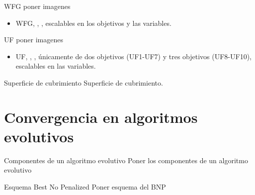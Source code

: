\documentclass{beamer}
\begin{document}
\begin{frame}{WFG}
poner imagenes
\begin{itemize}
   \item WFG, \citeauthor{Joel:WFG_Main}, \citeyear{Joel:WFG_Main}, escalables en los objetivos y las variables.
\end{itemize}
\end{frame}


\begin{frame}{UF}
poner imagenes
\begin{itemize}
   \item UF, \citeauthor{Joel:CEC2009}, \citeyear{Joel:CEC2009}, únicamente de dos objetivos (UF1-UF7) y tres objetivos (UF8-UF10), escalables en las variables.
\end{itemize}
\end{frame}



\begin{frame}{Superficie de cubrimiento}
Superficie de cubrimiento.
\end{frame}

\section{Convergencia en algoritmos evolutivos}

\begin{frame}{Componentes de un algoritmo evolutivo}
Poner los componentes de un algoritmo evolutivo    
\end{frame}

\begin{frame}{Esquema Best No Penalized}
Poner esquema del BNP
\end{frame}
\end{document}
